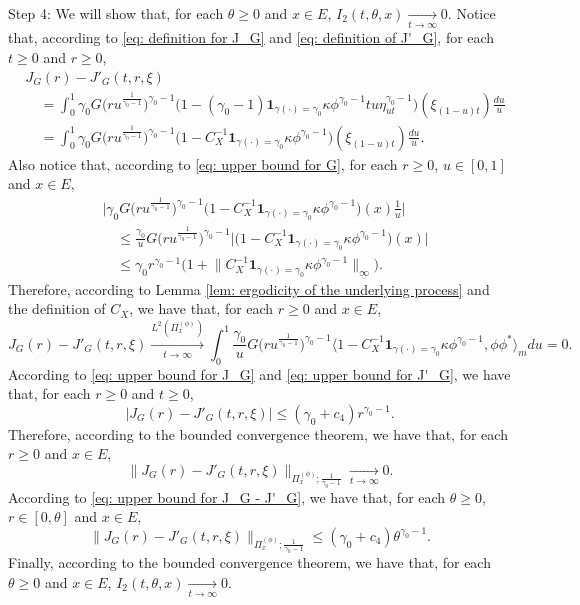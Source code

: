 \documentclass[12pt, a4paper]{amsart}
\theoremstyle{definition}
\numberwithin{equation}{section}
\begin{document}
	Step 4: We will show that, for each $\theta \geq 0$ and $x\in E$, $I_2(t,\theta,x) \xrightarrow[t\to \infty]{} 0$.
	Notice that, according to \eqref{eq: definition for J_G} and \eqref{eq: definition of J'_G}, for each $t\geq 0$ and $r\geq 0$,
\[\begin{split}
	&J_G(r) - J'_G(t,r,\xi)
	\\&\quad = \int_0^1 \gamma_0 G\big( ru^{\frac{1}{\gamma_0 - 1}} \big) ^{\gamma_0 - 1} \big( 1- (\gamma_0 - 1) \mathbf 1_{\gamma(\cdot) = \gamma_0} \kappa \phi^{\gamma_0 - 1} tu\eta_{ut}^{\gamma_0 - 1} \big)(\xi_{(1-u)t}) \frac{du}{u}
	\\&\quad = \int_0^1 \gamma_0 G\big( ru^{\frac{1}{\gamma_0 - 1}} \big) ^{\gamma_0 - 1} \big( 1- C_X^{-1}\mathbf 1_{\gamma(\cdot) = \gamma_0} \kappa \phi^{\gamma_0 - 1} \big)(\xi_{(1-u)t}) \frac{du}{u}.
\end{split}\]
	Also notice that,
	according to \eqref{eq: upper bound for G}, for each $r \geq 0$, $u\in [0,1]$ and $x\in E$,
\[\begin{split}
	&\big| \gamma_0 G\big( ru^{\frac{1}{\gamma_0 - 1}} \big) ^{\gamma_0 - 1} \big( 1- C_X^{-1}\mathbf 1_{\gamma(\cdot) = \gamma_0} \kappa \phi^{\gamma_0 - 1} \big)(x) \frac{1}{u} \big|
	\\&\quad \leq \frac{\gamma_0}{u} G\big( ru^{\frac{1}{\gamma_0 - 1}} \big) ^{\gamma_0 - 1} \big|\big( 1- C_X^{-1}\mathbf 1_{\gamma(\cdot) = \gamma_0} \kappa \phi^{\gamma_0 - 1} \big)(x) \big|
	\\&\quad \leq \gamma_0r^{\gamma_0 - 1} \big( 1+ \big\|C_X^{-1}\mathbf 1_{\gamma(\cdot) = \gamma_0} \kappa \phi^{\gamma_0 - 1} \big\|_\infty \big).
\end{split} \]
	Therefore, according to Lemma \ref{lem: ergodicity of the underlying process} and the definition of $C_X$, we have that, for each $r\geq 0$ and $x\in E$,
\[
	J_G(r) - J'_G(t,r,\xi)
	\xrightarrow[t\to \infty]{L^2(\Pi_x^{(\phi)})}
	\int_0^1 \frac{\gamma_0}{u} G\big( ru^{\frac{1}{\gamma_0 - 1}} \big) ^{\gamma_0 - 1} \big\langle 1- C_X^{-1}\mathbf 1_{\gamma(\cdot) = \gamma_0} \kappa \phi^{\gamma_0 - 1}, \phi\phi^*\big\rangle_m du
	=0.
\]
	According to \eqref{eq: upper bound for J_G} and \eqref{eq: upper bound for J'_G}, we have that, for each $r\geq 0$ and $t\geq 0$,
\[ \label{eq: upper bound for J_G - J'_G}
	\big| J_G(r) - J'_G(t,r,\xi)\big|
	\leq (\gamma_0 + c_4) r^{\gamma_0 - 1}.
\]
	Therefore, according to the bounded convergence theorem, we have that, for each $r\geq 0$ and $x\in E$,
\[
	 \big\|  J_G(r) - J'_G(t,r,\xi)  \big\|_{\Pi_x^{(\phi)};\frac{1}{\gamma_0 - 1}}
	 \xrightarrow[t\to \infty]{} 0.
\]
	According to \eqref{eq: upper bound for J_G - J'_G}, we have that, for each $\theta \geq 0$, $r\in [0,\theta]$ and $x\in E$,
\[
	\big\|  J_G(r) - J'_G(t,r,\xi)  \big\|_{\Pi_x^{(\phi)};\frac{1}{\gamma_0 - 1}}
	\leq (\gamma_0 + c_4) \theta^{\gamma_0 - 1}.
\]
	Finally, according to the bounded convergence theorem, we have that, for each $\theta\geq 0$ and $x\in E$, $I_2(t,\theta,x)\xrightarrow[t\to \infty]{} 0$.
	
\end{document}
